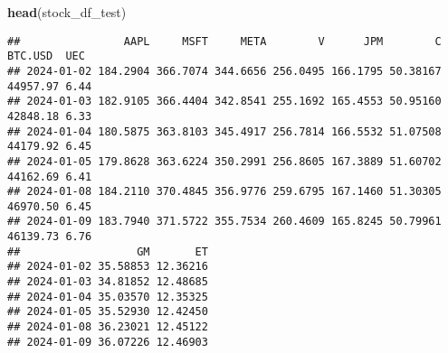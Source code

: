 \documentclass[
]{article}
\newenvironment{Shaded}{\begin{snugshade}}{\end{snugshade}}
\newcommand{\FunctionTok}[1]{\textcolor[rgb]{0.13,0.29,0.53}{\textbf{#1}}}
\newcommand{\NormalTok}[1]{#1}
\begin{document}
\begin{Shaded}
\begin{Highlighting}[]
\FunctionTok{head}\NormalTok{(stock\_df\_test)}
\end{Highlighting}
\end{Shaded}

\begin{verbatim}
##                AAPL     MSFT     META        V      JPM        C  BTC.USD  UEC
## 2024-01-02 184.2904 366.7074 344.6656 256.0495 166.1795 50.38167 44957.97 6.44
## 2024-01-03 182.9105 366.4404 342.8541 255.1692 165.4553 50.95160 42848.18 6.33
## 2024-01-04 180.5875 363.8103 345.4917 256.7814 166.5532 51.07508 44179.92 6.45
## 2024-01-05 179.8628 363.6224 350.2991 256.8605 167.3889 51.60702 44162.69 6.41
## 2024-01-08 184.2110 370.4845 356.9776 259.6795 167.1460 51.30305 46970.50 6.45
## 2024-01-09 183.7940 371.5722 355.7534 260.4609 165.8245 50.79961 46139.73 6.76
##                  GM       ET
## 2024-01-02 35.58853 12.36216
## 2024-01-03 34.81852 12.48685
## 2024-01-04 35.03570 12.35325
## 2024-01-05 35.52930 12.42450
## 2024-01-08 36.23021 12.45122
## 2024-01-09 36.07226 12.46903
\end{verbatim}
\end{document}

